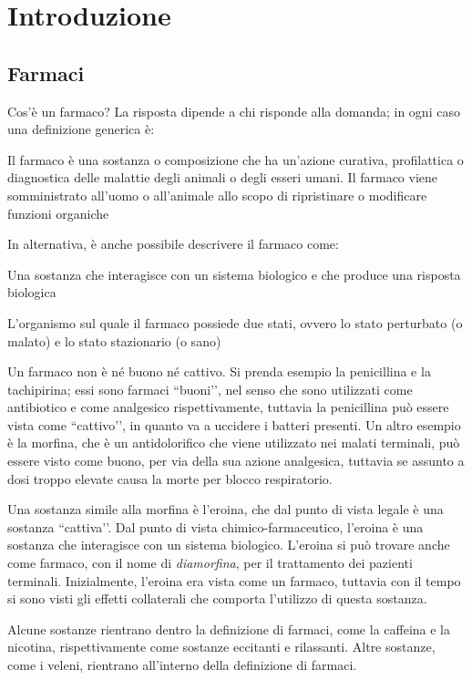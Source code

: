 \part{Introduzione}
\chapter{Farmaci}

Cos'è un farmaco?
La risposta dipende a chi risponde alla domanda; in ogni caso una definizione generica è:
\begin{quoting}
Il farmaco è una sostanza o composizione che ha un'azione curativa, profilattica o diagnostica delle malattie degli animali o degli esseri umani.
Il farmaco viene somministrato all'uomo o all'animale allo scopo di ripristinare o modificare funzioni organiche
\end{quoting}
In alternativa, è anche possibile descrivere il farmaco come:
\begin{quoting}
Una sostanza che interagisce con un sistema biologico e che produce una risposta biologica
\end{quoting}

L'organismo sul quale il farmaco possiede due stati, ovvero lo stato perturbato (o malato) e lo stato stazionario (o sano)

Un farmaco non è né buono né cattivo. Si prenda esempio la penicillina e la tachipirina; essi sono farmaci ``buoni’’, nel senso che sono utilizzati come antibiotico e come analgesico rispettivamente, tuttavia la penicillina può essere vista come ``cattivo’’, in quanto va a uccidere i batteri presenti.
Un altro esempio è la morfina, che è un antidolorifico che viene utilizzato nei malati terminali, può essere visto come buono, per via della sua azione analgesica, tuttavia se assunto a dosi troppo elevate causa la morte per blocco respiratorio.

Una sostanza simile alla morfina è l'eroina, che dal punto di vista legale è una sostanza ``cattiva’’. Dal punto di vista chimico-farmaceutico, l'eroina è una sostanza che interagisce con un sistema biologico. L'eroina si può trovare anche come farmaco, con il nome di \emph{diamorfina}, per il trattamento dei pazienti terminali. Inizialmente, l'eroina era vista come un farmaco, tuttavia con il tempo si sono visti gli effetti collaterali che comporta l'utilizzo di questa sostanza.

Alcune sostanze rientrano dentro la definizione di farmaci, come la caffeina e la nicotina, rispettivamente come sostanze eccitanti e rilassanti. Altre sostanze, come i veleni, rientrano all'interno della definizione di farmaci.

